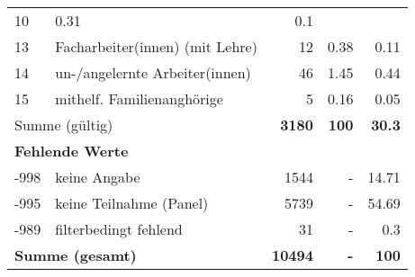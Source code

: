 \begin{longtable}{lXrrr}
       \num{10} &
       \num[round-mode=places,round-precision=2]{0.31} &
         \num[round-mode=places,round-precision=2]{0.1} \\

     13 &
     \multicolumn{1}{X}{ Facharbeiter(innen) (mit Lehre)   } &


       \num{12} &
       \num[round-mode=places,round-precision=2]{0.38} &
         \num[round-mode=places,round-precision=2]{0.11} \\

     14 &
     \multicolumn{1}{X}{ un-/angelernte Arbeiter(innen)   } &


       \num{46} &
       \num[round-mode=places,round-precision=2]{1.45} &
         \num[round-mode=places,round-precision=2]{0.44} \\

     15 &
     \multicolumn{1}{X}{ mithelf. Familienanghörige   } &


       \num{5} &
       \num[round-mode=places,round-precision=2]{0.16} &
         \num[round-mode=places,round-precision=2]{0.05} \\
     \midrule
     \multicolumn{2}{l}{Summe (gültig)} &
       \textbf{\num{3180}} &
     \textbf{\num{100}} &
       \textbf{\num[round-mode=places,round-precision=2]{30.3}} \\
     \multicolumn{5}{l}{\textbf{Fehlende Werte}}\\
       -998 &
       keine Angabe &
         \num{1544} &
        - &
         \num[round-mode=places,round-precision=2]{14.71} \\
       -995 &
       keine Teilnahme (Panel) &
         \num{5739} &
        - &
         \num[round-mode=places,round-precision=2]{54.69} \\
       -989 &
       filterbedingt fehlend &
         \num{31} &
        - &
         \num[round-mode=places,round-precision=2]{0.3} \\
     \midrule
     \multicolumn{2}{l}{\textbf{Summe (gesamt)}} &
          \textbf{\num{10494}} &
        \textbf{-} &
        \textbf{\num{100}} \\
     \bottomrule
     \end{longtable}
     
